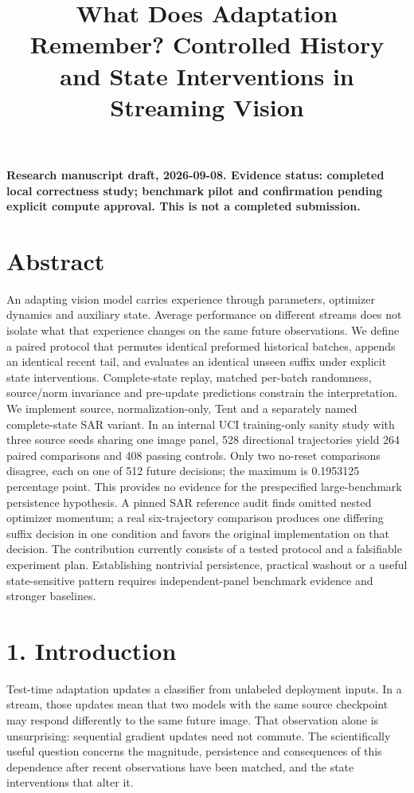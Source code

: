 \documentclass[11pt]{article}
\title{What Does Adaptation Remember? Controlled History and State Interventions in Streaming Vision}
\author{}
\date{}
\begin{document}
\maketitle
\textbf{Research manuscript draft, 2026-09-08. Evidence status: completed local correctness study; benchmark pilot and confirmation pending explicit compute approval. This is not a completed submission.}

\section*{Abstract}

An adapting vision model carries experience through parameters, optimizer dynamics and auxiliary state. Average performance on different streams does not isolate what that experience changes on the same future observations. We define a paired protocol that permutes identical preformed historical batches, appends an identical recent tail, and evaluates an identical unseen suffix under explicit state interventions. Complete-state replay, matched per-batch randomness, source/norm invariance and pre-update predictions constrain the interpretation. We implement source, normalization-only, Tent and a separately named complete-state SAR variant. In an internal UCI training-only sanity study with three source seeds sharing one image panel, 528 directional trajectories yield 264 paired comparisons and 408 passing controls. Only two no-reset comparisons disagree, each on one of 512 future decisions; the maximum is 0.1953125 percentage point. This provides no evidence for the prespecified large-benchmark persistence hypothesis. A pinned SAR reference audit finds omitted nested optimizer momentum; a real six-trajectory comparison produces one differing suffix decision in one condition and favors the original implementation on that decision. The contribution currently consists of a tested protocol and a falsifiable experiment plan. Establishing nontrivial persistence, practical washout or a useful state-sensitive pattern requires independent-panel benchmark evidence and stronger baselines.

\section*{1. Introduction}

Test-time adaptation updates a classifier from unlabeled deployment inputs. In a stream, those updates mean that two models with the same source checkpoint may respond differently to the same future image. That observation alone is unsurprising: sequential gradient updates need not commute. The scientifically useful question concerns the magnitude, persistence and consequences of this dependence after recent observations have been matched, and the state interventions that alter it.
\end{document}
